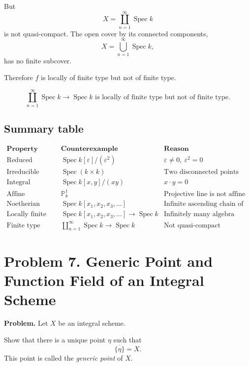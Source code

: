 \documentclass[12pt,a4paper]{article}
\theoremstyle{notespace}
\begin{document}
But
\[
X=\coprod_{n=1}^{\infty}\operatorname{Spec}k
\]
is not quasi-compact. The open cover by its connected components,
\[
X=\bigcup_{n=1}^{\infty}\operatorname{Spec}k,
\]
has no finite subcover.

Therefore \(f\) is locally of finite type but not of finite type.

\[
\boxed{
	\coprod_{n=1}^{\infty}\operatorname{Spec}k
	\longrightarrow
	\operatorname{Spec}k
	\text{ is locally of finite type but not of finite type.}
}
\]

\subsection*{Summary table}

\[
\begin{array}{c|c|c}
	\textbf{Property} & \textbf{Counterexample} & \textbf{Reason} \\
	\hline
	\text{Reduced} &
	\operatorname{Spec}k[\varepsilon]/(\varepsilon^2) &
	\varepsilon\neq 0,\ \varepsilon^2=0
	\\
	\hline
	\text{Irreducible} &
	\operatorname{Spec}(k\times k) &
	\text{Two disconnected points}
	\\
	\hline
	\text{Integral} &
	\operatorname{Spec}k[x,y]/(xy) &
	x\cdot y=0
	\\
	\hline
	\text{Affine} &
	\mathbb{P}^1_k &
	\text{Projective line is not affine}
	\\
	\hline
	\text{Noetherian} &
	\operatorname{Spec}k[x_1,x_2,x_3,\dots] &
	\text{Infinite ascending chain of ideals}
	\\
	\hline
	\text{Locally finite type} &
	\operatorname{Spec}k[x_1,x_2,x_3,\dots]\to\operatorname{Spec}k &
	\text{Infinitely many algebra generators}
	\\
	\hline
	\text{Finite type} &
	\coprod_{n=1}^{\infty}\operatorname{Spec}k\to\operatorname{Spec}k &
	\text{Not quasi-compact}
\end{array}
\]


\section{Problem 7. Generic Point and Function Field of an Integral Scheme}

\textbf{Problem.}
Let \(X\) be an integral scheme.

Show that there is a unique point \(\eta\) such that
\[
\overline{\{\eta\}}=X.
\]
This point is called the \emph{generic point} of \(X\).
\end{document}
